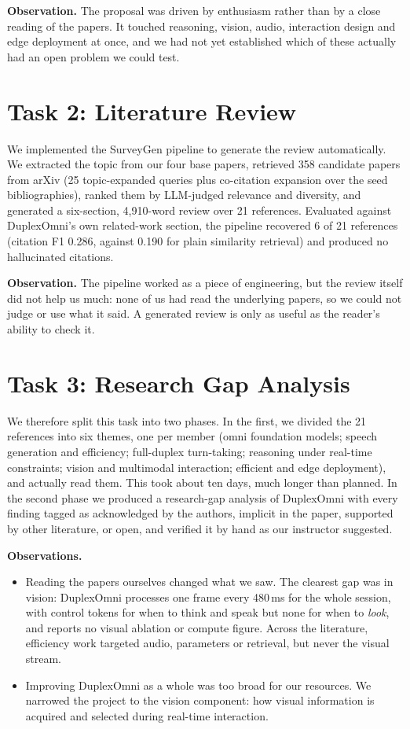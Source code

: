 \documentclass[11pt]{article}
\begin{document}
\textbf{Observation.} The proposal was driven by enthusiasm rather than by a close reading of the papers. It touched reasoning, vision, audio, interaction design and edge deployment at once, and we had not yet established which of these actually had an open problem we could test.

\section*{Task 2: Literature Review}
We implemented the SurveyGen pipeline to generate the review automatically. We extracted the topic from our four base papers, retrieved 358 candidate papers from arXiv (25 topic-expanded queries plus co-citation expansion over the seed bibliographies), ranked them by LLM-judged relevance and diversity, and generated a six-section, 4{,}910-word review over 21 references. Evaluated against DuplexOmni's own related-work section, the pipeline recovered 6 of 21 references (citation F1 0.286, against 0.190 for plain similarity retrieval) and produced no hallucinated citations.

\textbf{Observation.} The pipeline worked as a piece of engineering, but the review itself did not help us much: none of us had read the underlying papers, so we could not judge or use what it said. A generated review is only as useful as the reader's ability to check it.

\section*{Task 3: Research Gap Analysis}
We therefore split this task into two phases. In the first, we divided the 21 references into six themes, one per member (omni foundation models; speech generation and efficiency; full-duplex turn-taking; reasoning under real-time constraints; vision and multimodal interaction; efficient and edge deployment), and actually read them. This took about ten days, much longer than planned. In the second phase we produced a research-gap analysis of DuplexOmni with every finding tagged as acknowledged by the authors, implicit in the paper, supported by other literature, or open, and verified it by hand as our instructor suggested.

\textbf{Observations.}
\begin{itemize}
\item Reading the papers ourselves changed what we saw. The clearest gap was in vision: DuplexOmni processes one frame every 480\,ms for the whole session, with control tokens for when to think and speak but none for when to \emph{look}, and reports no visual ablation or compute figure. Across the literature, efficiency work targeted audio, parameters or retrieval, but never the visual stream.
\item Improving DuplexOmni as a whole was too broad for our resources. We narrowed the project to the vision component: how visual information is acquired and selected during real-time interaction.
\end{itemize}
\end{document}
